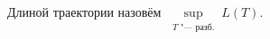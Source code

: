 
    	Длиной траектории назовём $\sup\limits_{\substack{T\text{ "--- разб.}\\ [t_0,t_1]}} L(T)$.
    
